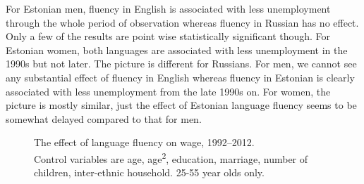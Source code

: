 \documentclass[12pt, a4paper]{article}
\newcommand{\modelTwo}{age, age\textsuperscript{2}, education, marriage, number of children, inter-ethnic household}
\newcommand{\agerestrictions}{25-55 year olds only.}
\begin{document}
For Estonian men, fluency in English is associated with less unemployment through the whole
period of observation whereas fluency in Russian has no effect.
Only a few of the results are point wise statistically significant though.
For Estonian women, both languages are associated with less
unemployment in the 1990s but not later. The picture is different for
Russians. For men, we cannot see any substantial effect of fluency in English
whereas fluency in Estonian is clearly associated with less unemployment from
the late 1990s on. For women, the picture is mostly similar, just the
effect of Estonian language fluency seems to be somewhat delayed compared to
that for men.

\begin{figure}[htb]
	\centering
	\caption{The effect of language fluency on wage, 1992--2012. \\ Control variables are \modelTwo. \agerestrictions}
	\label{fig:long-run_wage}
\end{figure}
\end{document}
